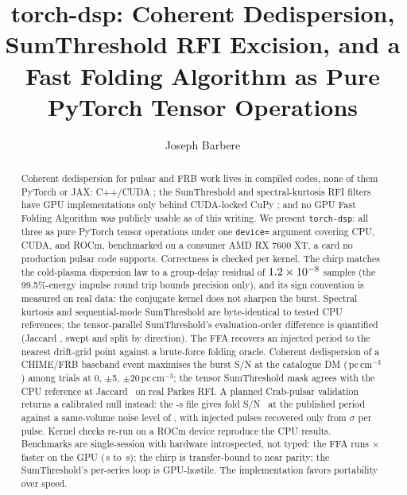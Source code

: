 \documentclass[twocolumn]{aastex631}
\newcommand{\code}[1]{\texttt{#1}}
\begin{document}
\title{torch-dsp: Coherent Dedispersion, SumThreshold RFI Excision, and a Fast Folding
Algorithm as Pure PyTorch Tensor Operations}
\author[0009-0008-3289-4447]{Joseph Barbere}

\begin{abstract}
Coherent dedispersion for pulsar and FRB work lives in compiled codes, none of them
PyTorch or JAX: C++/CUDA
\citep{vanstraten2011,bassa2017}; the SumThreshold and spectral-kurtosis RFI filters
\citep{offringa2010,nita2010} have GPU implementations only behind CUDA-locked CuPy
\citep{kania2026}; and no GPU Fast Folding Algorithm \citep{staelin1969,morello2020}
was publicly usable as of this writing. We present \code{torch-dsp}: all three as pure
PyTorch tensor operations under one \code{device=} argument covering CPU, CUDA, and
ROCm, benchmarked on a consumer AMD RX 7600 XT, a card no production pulsar code
supports.
Correctness is checked per kernel. The chirp matches the cold-plasma dispersion law to
a group-delay residual of $1.2\times10^{-8}$ samples (the 99.5\%-energy impulse
round trip bounds precision only), and its sign convention is measured on real data:
the conjugate kernel does not sharpen the burst. Spectral kurtosis and sequential-mode
SumThreshold are byte-identical to tested CPU references; the tensor-parallel
SumThreshold's evaluation-order difference is quantified (Jaccard \tdRealStJaccard,
swept and split by direction). The FFA recovers an injected period to the nearest
drift-grid point against a brute-force folding oracle. Coherent dedispersion of a
CHIME/FRB baseband event \citep{chimebaseband2024} maximises the burst S/N at the
catalogue DM (\tdRealChimeDm\,pc\,cm$^{-3}$) among trials at 0, $\pm$5,
$\pm$20\,pc\,cm$^{-3}$; the tensor SumThreshold mask agrees with the CPU reference at
Jaccard \tdRealCrabJaccard\ on real Parkes RFI. A planned Crab-pulsar validation
returns a calibrated null instead: the \tdRealCrabDur-s file gives fold S/N
\tdRealCrabFoldPub\ at the published period against a same-volume noise level of
\tdRealCrabNoiseSnr, with injected pulses recovered only from \tdRealCrabInjMin$\sigma$
per pulse. Kernel checks re-run on a ROCm device reproduce the CPU results. Benchmarks are single-session
with hardware introspected, not typed: the FFA runs \tdRealSpeedupFfa$\times$ faster
on the GPU (\tdRealBenchFfaCpu\,s to \tdRealBenchFfaGpu\,s); the chirp is
transfer-bound to near parity; the SumThreshold's per-series loop is GPU-hostile. The
implementation favors portability over speed.
\end{abstract}
\end{document}
